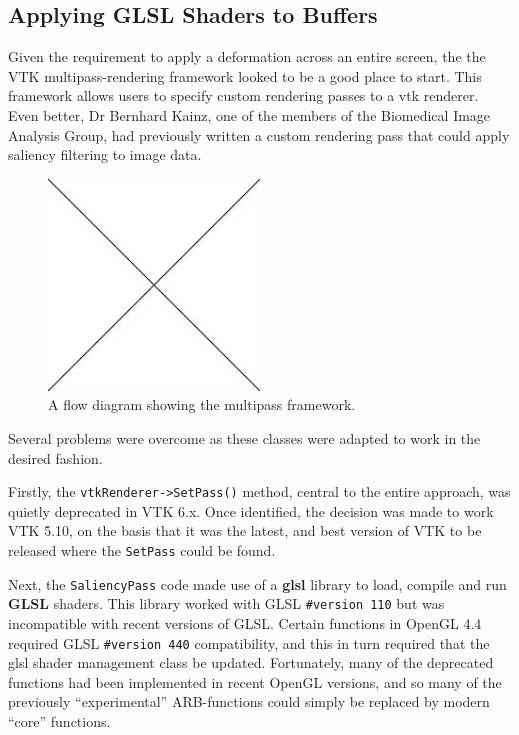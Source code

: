 \documentclass[MSc,paper=a4,pagesize=auto]{icldt}
\begin{document}
\subsection{Applying GLSL Shaders to Buffers}
Given the requirement to apply a deformation across an entire screen, the the VTK multipass-rendering framework looked to be a good place to start. This framework allows users to specify custom rendering passes to a vtk renderer. Even better, Dr Bernhard Kainz, one of the members of the Biomedical Image Analysis Group, had previously written a custom rendering pass that could apply saliency filtering to image data.

\begin{figure}[htbp!]
    \centering
    \includegraphics[width=0.5\textwidth]{resources/placeholder}
    \caption{A flow diagram showing the multipass framework.}
    \label{fig:multipass_rendering}
\end{figure}

Several problems were overcome as these classes were adapted to work in the desired fashion.

Firstly, the \texttt{vtkRenderer->SetPass()} method, central to the entire approach, was quietly deprecated in VTK 6.x. Once identified,  the decision was made to work VTK 5.10, on the basis that it was the latest, and best version of VTK to be released where the \texttt{SetPass} could be found.

Next, the \texttt{SaliencyPass} code made use of a \textbf{glsl} library to load, compile and run \textbf{GLSL} shaders. This library worked with GLSL \texttt{\#version 110} but was incompatible with recent versions of GLSL. Certain functions in OpenGL 4.4 required GLSL \texttt{\#version 440} compatibility, and this in turn required that the glsl shader management class be updated. Fortunately, many of the deprecated functions had been implemented in recent OpenGL versions, and so many of the previously ``experimental'' ARB-functions could simply be replaced by modern ``core'' functions.
\end{document}
